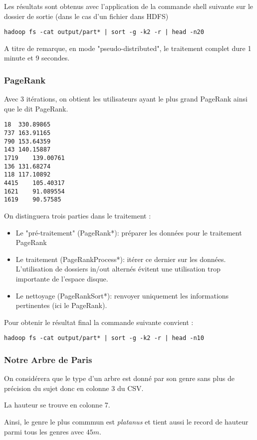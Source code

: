 \documentclass[french]{article}
\begin{document}
Les résultats sont obtenus avec l'application de la commande shell suivante sur le dossier de sortie (dans le cas d'un fichier dans HDFS)

\begin{verbatim}
hadoop fs -cat output/part* | sort -g -k2 -r | head -n20
\end{verbatim}

A titre de remarque, en mode "pseudo-distributed", le traitement complet dure 1 minute et 9 secondes.

\subsubsection{PageRank}

Avec 3 itérations, on obtient les utilisateurs ayant le plus grand PageRank ainsi que le dit PageRank.

\begin{verbatim}
18	330.89865
737	163.91165
790	153.64359
143	140.15887
1719	139.00761
136	131.68274
118	117.10892
4415	105.40317
1621	91.089554
1619	90.57585
\end{verbatim}

On distinguera trois parties dans le traitement :

\begin{itemize}
	\item Le "pré-traitement" (PageRank*): préparer les données pour le traitement PageRank
	\item Le traitement (PageRankProcess*): itérer ce dernier sur les données. L'utilisation de dossiers in/out alternés évitent une utilisation trop importante de l'espace disque.
	\item Le nettoyage (PageRankSort*): renvoyer uniquement les informations pertinentes (ici le PageRank).
\end{itemize}

Pour obtenir le résultat final la commande suivante convient : 

\begin{verbatim}
hadoop fs -cat output/part* | sort -g -k2 -r | head -n10
\end{verbatim}

\subsubsection{Notre Arbre de Paris}
On considérera que le type d'un arbre est donné par son genre sans plus de précision du sujet donc en colonne 3 du CSV.

La hauteur se trouve en colonne 7.

Ainsi, le genre le plus commmun est \textsl{platanus} et tient aussi le record de hauteur parmi tous les genres avec $45m$.
\end{document}
